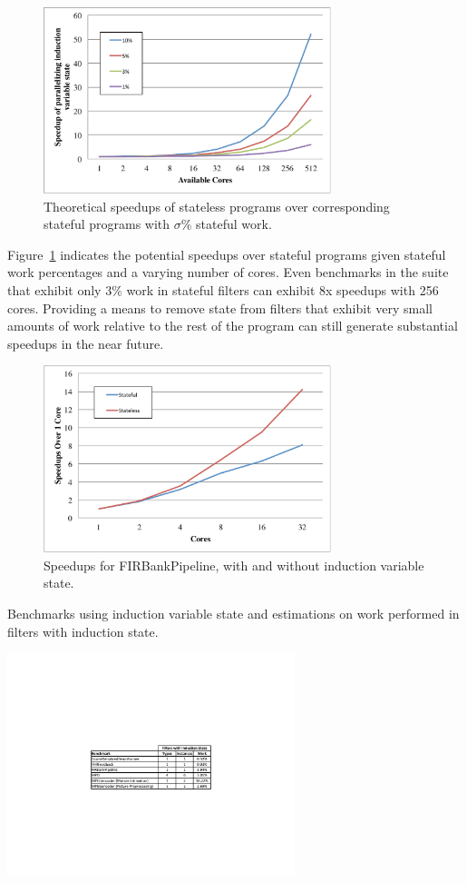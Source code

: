\begin{figure}[t!]
\includegraphics[width=3.3in]{figures/theoretic-speedup.pdf}
\caption{Theoretical speedups of stateless programs over corresponding stateful programs with $\sigma$\% stateful work.  \protect\label{fig:theo-speedups}}
\end{figure}

Figure~\ref{fig:theo-speedups} indicates the potential speedups over stateful programs given stateful work percentages and a varying number of cores.  Even benchmarks in the suite that exhibit only 3\% work in stateful filters can exhibit 8x speedups with 256 cores.  Providing a means to remove state from filters that exhibit very small amounts of work relative to the rest of the program can still generate substantial speedups in the near future.

\begin{figure}[t]
\includegraphics[width=3.3in]{figures/firbank-results.pdf}
\caption{Speedups for FIRBankPipeline, with and without induction variable state.  \protect\label{fig:firbank-results}}
\end{figure}



\begin{table}[t]
\caption{Benchmarks using induction variable state and estimations on work performed in filters with induction state.\protect\label{fig:benchmarks}}
\includegraphics[width=3.3in]{figures/induction-benchmarks.pdf}
\end{table}


